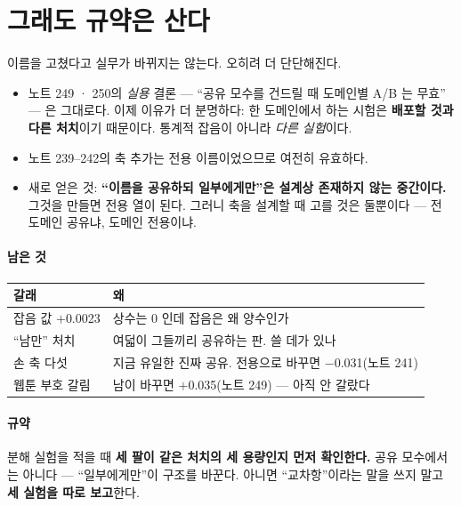 \documentclass[10pt]{article}
\begin{document}
\section{그래도 규약은 산다}

이름을 고쳤다고 실무가 바뀌지는 않는다. 오히려 더 단단해진다.

\begin{itemize}
\item 노트 249 · 250의 \emph{실용} 결론 --- ``공유 모수를 건드릴 때 도메인별
A/B 는 무효'' --- 은 그대로다. 이제 이유가 더 분명하다: 한 도메인에서 하는
시험은 \textbf{배포할 것과 다른 처치}이기 때문이다. 통계적 잡음이 아니라
\emph{다른 실험}이다.
\item 노트 239--242의 축 추가는 전용 이름이었으므로 여전히 유효하다.
\item 새로 얻은 것: \textbf{``이름을 공유하되 일부에게만''은 설계상 존재하지
않는 중간이다.} 그것을 만들면 전용 열이 된다. 그러니 축을 설계할 때 고를 것은
둘뿐이다 --- 전 도메인 공유냐, 도메인 전용이냐.
\end{itemize}

\paragraph{남은 것}
\begin{center}\small
\begin{tabular}{ll}
\hline
갈래 & 왜 \\
\hline
잡음 값 $+$0.0023 & 상수는 0 인데 잡음은 왜 양수인가 \\
``남만'' 처치 & 여덟이 그들끼리 공유하는 판. 쓸 데가 있나 \\
손 축 다섯 & 지금 유일한 진짜 공유. 전용으로 바꾸면 $-$0.031(노트 241) \\
웹툰 부호 갈림 & 남이 바꾸면 $+$0.035(노트 249) --- 아직 안 갈랐다 \\
\hline
\end{tabular}
\end{center}

\paragraph{규약} 분해 실험을 적을 때 \textbf{세 팔이 같은 처치의 세 용량인지
먼저 확인한다.} 공유 모수에서는 아니다 --- ``일부에게만''이 구조를 바꾼다.
아니면 ``교차항''이라는 말을 쓰지 말고 \textbf{세 실험을 따로 보고}한다.
\end{document}

